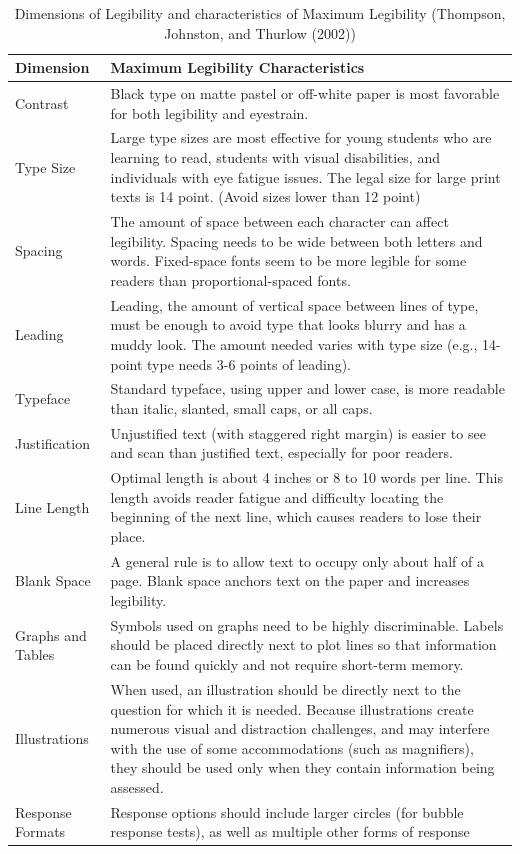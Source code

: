 \documentclass[11.5pt]{sig-alternate} %
\begin{document}
\begin{large}
\begin{table}[tph]
\caption{Dimensions of Legibility and characteristics of Maximum Legibility (Thompson, Johnston, and Thurlow (2002))}
\begin{tabular}{|l|l|}
\hline
\textbf{Dimension} & \textbf{Maximum Legibility Characteristics} \\ \hline
Contrast & Black type on matte pastel or off-white paper is most favorable for both legibility and eyestrain. \\ \hline
Type Size & Large type sizes are most effective for young students who are learning to read, students with visual disabilities, and individuals with eye fatigue issues. The legal size for large print texts is 14 point. (Avoid sizes lower than 12 point) \\  \hline
Spacing & The amount of space between each character can affect legibility. Spacing needs to 
be wide between both letters and words. Fixed-space fonts seem to be more legible 
for some readers than proportional-spaced fonts. \\ \hline
Leading & Leading, the amount of vertical space between lines of type, must be enough to avoid 
type that looks blurry and has a muddy look. The amount needed varies with type size 
(e.g., 14-point type needs 3-6 points of leading). \\ \hline
Typeface & Standard typeface, using upper and lower case, is more readable than italic, slanted, 
small caps, or all caps. \\ \hline
Justification & Unjustified text (with staggered right margin) is easier to see and scan than justified text, especially for poor readers. \\ \hline
Line Length & Optimal length is about 4 inches or 8 to 10 words per line. This length avoids reader fatigue and difficulty locating the beginning of the next line, which causes readers to lose their place. \\
Blank Space & A general rule is to allow text to occupy only about half of a page. Blank space anchors text on the paper and increases legibility. \\ \hline
Graphs and Tables & Symbols used on graphs need to be highly discriminable. Labels should be placed directly next to plot lines so that information can be found quickly and not require short-term memory. \\ \hline
Illustrations & When used, an illustration should be directly next to the question for which it is needed. Because illustrations create numerous visual and distraction challenges, and may interfere with the use of some accommodations (such as magnifiers), they should be used only when they contain information being assessed. \\ \hline
Response Formats & Response options should include larger circles (for bubble response tests), as well as  multiple other forms of response \\ \hline
\end{tabular}
\end{table}


\end{large}
\end{document}
